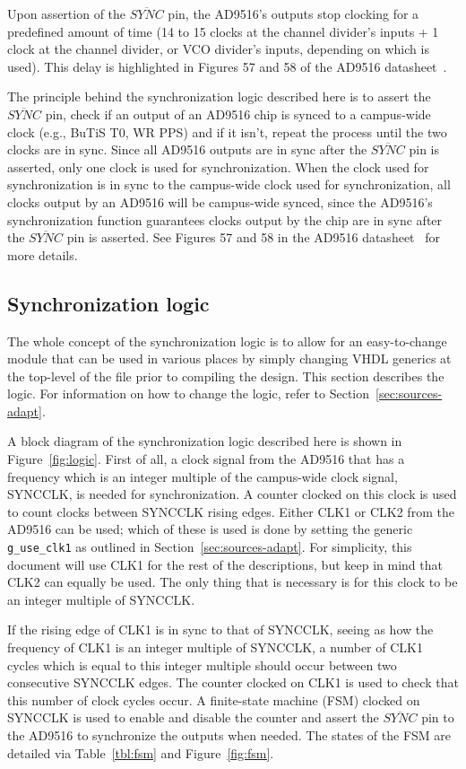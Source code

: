 \documentclass[a4paper,11pt]{article}
\begin{document}
Upon assertion of the $\overline{SYNC}$ pin, the AD9516's outputs stop clocking for a
predefined amount of time (14 to 15 clocks at the channel divider's inputs + 1 clock at
the channel divider, or VCO divider's inputs, depending on which is used). This delay is
highlighted in Figures 57 and 58 of the AD9516 datasheet~\cite{ad9516-3}.

The principle behind the synchronization logic described here is to assert the
$\overline{SYNC}$ pin, check if an output of an AD9516 chip is synced to
a campus-wide clock (e.g., BuTiS T0, WR PPS) and if it isn't, repeat the process
until the two clocks are in sync. Since all AD9516 outputs are in sync after the
$\overline{SYNC}$ pin is asserted, only one clock is used for synchronization.
When the clock used for synchronization is in sync to the campus-wide clock used for 
synchronization, all clocks output by an AD9516 will be campus-wide synced, since
the AD9516's synchronization function guarantees clocks output by the chip are in sync
after the $\overline{SYNC}$ pin is asserted. See Figures 57 and 58 in the
AD9516 datasheet~\cite{ad9516-3} for more details.

\subsection{Synchronization logic}

The whole concept of the synchronization logic is to allow for an easy-to-change module
that can be used in various places by simply changing VHDL generics at the top-level
of the file prior to compiling the design. This section describes the logic. For
information on how to change the logic, refer to Section~\ref{sec:sources-adapt}.

A block diagram of the synchronization logic described here is shown in
Figure~\ref{fig:logic}. First of all, a clock signal from the AD9516 that has a
frequency which is an integer multiple of the campus-wide clock signal, SYNCCLK, is 
needed for synchronization. A counter clocked on this clock is used to count clocks 
between SYNCCLK rising edges. Either CLK1 or CLK2 from the AD9516 can be used;
which of these is used is done by setting the generic \verb=g_use_clk1= as 
outlined in Section~\ref{sec:sources-adapt}. For simplicity, this document will use 
CLK1 for the rest of the descriptions, but keep in mind that CLK2 can equally be used.
The only thing that is necessary is for this clock to be an integer multiple of SYNCCLK.

If the rising edge of CLK1 is in sync to that of SYNCCLK, seeing as how the frequency of 
CLK1 is an integer multiple of SYNCCLK, a number of CLK1 cycles which is equal to this 
integer multiple should occur between two consecutive SYNCCLK edges. The counter clocked 
on CLK1 is used to check that this number of clock cycles occur. A finite-state machine 
(FSM) clocked on SYNCCLK is used to enable and disable the counter and assert the
$\overline{SYNC}$ pin to the AD9516 to synchronize the outputs when needed. The states of 
the FSM are detailed via Table~\ref{tbl:fsm} and Figure~\ref{fig:fsm}.
\end{document}
